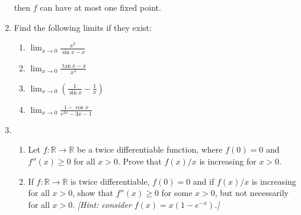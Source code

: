 \documentclass[12pt]{article}
\newcommand{\R}{\mathbb{R}}
\begin{document}
\begin{enumerate}
    then $f$ can have at most one fixed point.
  \item Find the following limits if they exist:
    \begin{enumerate}
      \item $\lim_{x\to 0} \frac{x^3}{\sin x - x}$
      \item $\lim_{x\to 0} \frac{\tan x -x}{x^3}$
      \item $\lim_{x\to 0} \left( \frac{1}{\sin x} - \frac{1}{x} \right)$
      \item $\lim_{x\to 0} \frac{1-\cos x}{e^{3x}-3x-1}$
    \end{enumerate}
  \item
    \begin{enumerate}
      \item Let $f: \R \to \R$ be a twice differentiable function, where
	$f(0)=0$ and $f''(x)\ge 0$ for all $x>0$. Prove that $f(x)/x$ is
	increasing for $x>0$.
      \item If $f: \R \to \R$ is twice differentiable, $f(0)=0$ and if $f(x)/x$
	is increasing for all $x>0$, show that $f''(x)\ge 0$ for some $x>0$,
	but not necessarily for all $x>0$. {\it [Hint: consider
	$f(x)=x(1-e^{-x})$.]}
    \end{enumerate}
\end{enumerate}
\end{document}
